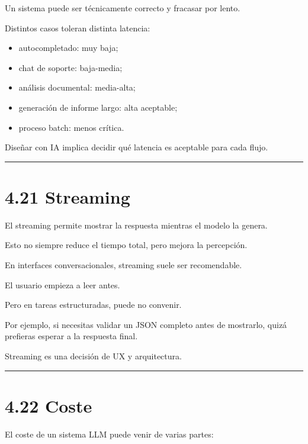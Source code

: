 Un sistema puede ser técnicamente correcto y fracasar por lento.

Distintos casos toleran distinta latencia:

\begin{itemize}
\tightlist
\item
  autocompletado: muy baja;
\item
  chat de soporte: baja-media;
\item
  análisis documental: media-alta;
\item
  generación de informe largo: alta aceptable;
\item
  proceso batch: menos crítica.
\end{itemize}

Diseñar con IA implica decidir qué latencia es aceptable para cada
flujo.

\begin{center}\rule{0.5\linewidth}{0.5pt}\end{center}

\section{4.21 Streaming}\label{streaming}

El streaming permite mostrar la respuesta mientras el modelo la genera.

Esto no siempre reduce el tiempo total, pero mejora la percepción.

En interfaces conversacionales, streaming suele ser recomendable.

El usuario empieza a leer antes.

Pero en tareas estructuradas, puede no convenir.

Por ejemplo, si necesitas validar un JSON completo antes de mostrarlo,
quizá prefieras esperar a la respuesta final.

Streaming es una decisión de UX y arquitectura.

\begin{center}\rule{0.5\linewidth}{0.5pt}\end{center}

\section{4.22 Coste}\label{coste-2}

El coste de un sistema LLM puede venir de varias partes:

